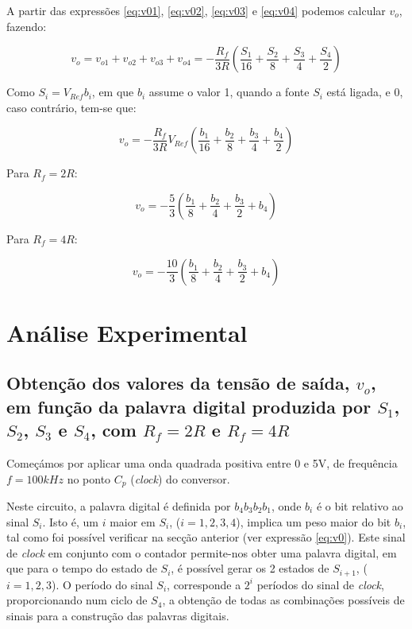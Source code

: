 \documentclass[a4paper,11pt]{report}
\begin{document}
A partir das expressões \ref{eq:v01}, \ref{eq:v02}, \ref{eq:v03} e \ref{eq:v04} podemos calcular $v_o$, fazendo:

$$v_o=v_{o1}+v_{o2}+v_{o3}+v_{o4}=-\frac{R_f}{3R}\left(\frac{S_1}{16}+\frac{S_2}{8}+\frac{S_3}{4}+\frac{S_4}{2}\right)$$

Como $S_i=V_{Ref}b_i$, em que $b_i$ assume o valor 1, quando a fonte $S_i$ está ligada, e 0, caso contrário, tem-se que:

\begin{equation}\label{eq:v0}
v_o=-\frac{R_f}{3R}V_{Ref}\left(\frac{b_1}{16}+\frac{b_2}{8}+\frac{b_3}{4}+\frac{b_4}{2}\right)
\end{equation}


Para $R_f=2R$:

\begin{equation}\label{eq:v02R}
\boxed{v_o=-\frac{5}{3}\left(\frac{b_1}{8}+\frac{b_2}{4}+\frac{b_3}{2}+{b_4}\right)}
\end{equation}

Para $R_f=4R$:

\begin{equation}\label{eq:v04R}
\boxed{v_o=-\frac{10}{3}\left(\frac{b_1}{8}+\frac{b_2}{4}+\frac{b_3}{2}+{b_4}\right)}
\end{equation}

\section{Análise Experimental}

\subsection{Obtenção dos valores da tensão de saída, $v_o$, em função da palavra digital produzida por $S_1$, $S_2$, $S_3$ e $S_4$, com $R_f=2R$ e $R_f=4R$}

Começámos por aplicar uma onda quadrada positiva entre 0 e 5V, de frequência $f=100kHz$ no ponto $C_p$ (\textit{clock}) do conversor.

Neste circuito, a palavra digital é definida por $b_4b_3b_2b_1$, onde $b_i$ é o bit relativo ao sinal $S_i$. Isto é, um $i$ maior em $S_i$, ($i=1,2,3,4$), implica um peso maior do bit $b_i$, tal como foi possível verificar na secção anterior (ver expressão \ref{eq:v0}). Este sinal de \textit{clock} em conjunto com o contador permite-nos obter uma palavra digital, em que para o tempo do estado de $S_i$, é possível gerar os 2 estados de $S_{i+1}$, ($i=1,2,3$). O período do sinal $S_i$, corresponde a $2^i$ períodos do sinal de \textit{clock}, proporcionando num ciclo de $S_4$, a obtenção de todas as combinações possíveis de sinais para a construção das palavras digitais.
\end{document}
